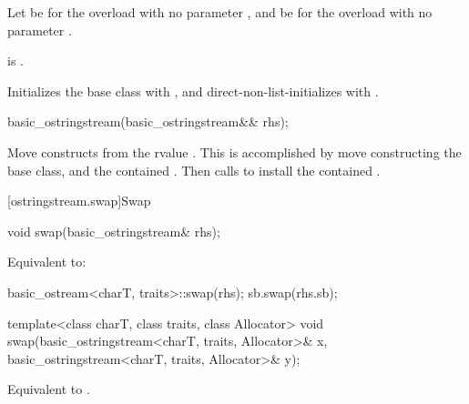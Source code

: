 \begin{itemdescr}
\pnum
Let  be 
for the overload with no parameter , and
 be  for the overload with no parameter .

\pnum
\constraints
{}
is .

\pnum
\effects
Initializes the base class with , and
direct-non-list-initializes  with .
\end{itemdescr}

%
\begin{itemdecl}
basic_ostringstream(basic_ostringstream&& rhs);
\end{itemdecl}

\begin{itemdescr}
\pnum
\effects
Move constructs from the rvalue . This
is accomplished by move constructing the base class, and the contained
.
Then calls 
to install the contained .
\end{itemdescr}

[ostringstream.swap]{Swap}

%
\begin{itemdecl}
void swap(basic_ostringstream& rhs);
\end{itemdecl}

\begin{itemdescr}
\pnum
\effects
Equivalent to:
\begin{codeblock}
basic_ostream<charT, traits>::swap(rhs);
sb.swap(rhs.sb);
\end{codeblock}
\end{itemdescr}

%
\begin{itemdecl}
template<class charT, class traits, class Allocator>
  void swap(basic_ostringstream<charT, traits, Allocator>& x,
            basic_ostringstream<charT, traits, Allocator>& y);
\end{itemdecl}

\begin{itemdescr}
\pnum
\effects
Equivalent to .
\end{itemdescr}

